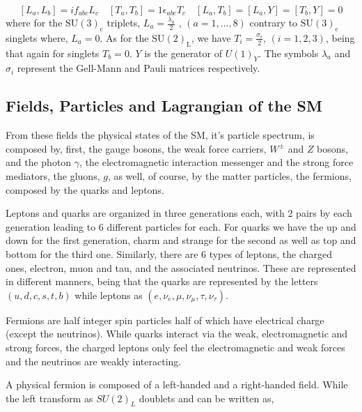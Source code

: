 % 
\begin{equation}
\left[ L_a , L_b \right] = i f_{abc} L_c \quad \left[ T_a , T_b \right] = 1 \epsilon_{abc} T_c \quad \left[ L_a , T_b \right] = \left[ L_a , Y \right] = \left[ T_b,Y \right] = 0 
\end{equation}
%
where for the $\mathrm{SU(3)_c}$ triplets, $L_a= \frac{\lambda_a}{2}$ , $(a = 1, . . . , 8)$ {\color{gray} contrary to $\mathrm{SU(3)_c}$ singlets where, $L_a = 0$}.  As for the $\mathrm{SU(2)_L}$, we have $T_i= \frac{\sigma_i}{2} $, $(i = 1, 2, 3)$, {\color{gray} being that again for singlets $T_b=0$}. $Y$ is the generator of $U(1)_Y$. The symbols $\lambda_a$ and $\sigma_i$ represent the Gell-Mann and Pauli matrices respectively. 

\subsection{Fields, Particles and Lagrangian of the SM}

From these fields the physical states of the SM, it's particle spectrum, is composed by, first, the gauge bosons, the weak force carriers, $W^\pm$ and $Z$ bosons, and the photon $\gamma$, the electromagnetic interaction messenger and the strong force mediators, the gluons, $g$, as well, of course, by the matter particles, the fermions, composed by the quarks and leptons. 

Leptons and quarks are organized in three generations each, with 2 pairs by each generation leading to 6 different particles for each. 
%
For quarks we have the up and down for the first generation, charm and strange for the second as well as top and bottom for the third one. 
%
Similarly, there are 6 types of leptons, the charged ones, electron, muon and tau, and the associated neutrinos. These are represented in different manners, being that the quarks are represented by the letters $(u,d,c,s,t,b)$ while leptons as $(e,\nu_{e},\mu,\nu_{\mu},\tau,\nu_{\tau})$. 

Fermions are half integer spin particles half of which have electrical charge (except the neutrinos).  While quarks interact via the weak, electromagnetic and strong forces, the charged leptons only feel the electromagnetic and weak forces and the neutrinos are weakly interacting.  

A physical fermion is composed of a left-handed and a right-handed field. While the left transform as $SU(2)_L$ doublets and can be written as,

